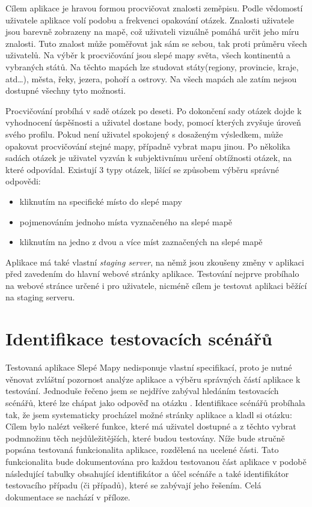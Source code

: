 \documentclass[
    color,   %
	table,   %
    twoside, %
]{fithesis3}
\begin{document}
Cílem aplikace je hravou formou procvičovat znalosti zeměpisu. Podle vědomostí uživatele aplikace volí podobu a frekvenci opakování otázek. Znalosti uživatele jsou barevně zobrazeny na mapě, což uživateli vizuálně pomáhá určit jeho míru znalosti. Tuto znalost může poměřovat jak sám se sebou, tak proti průměru všech uživatelů. Na výběr k procvičování jsou slepé mapy světa, všech kontinentů a vybraných států. Na těchto mapách lze studovat státy(regiony, provincie, kraje, atd\ldots), města, řeky, jezera, pohoří a ostrovy. Na všech mapách ale zatím nejsou dostupné všechny tyto možnosti.

Procvičování probíhá v sadě otázek po deseti. Po dokončení sady otázek dojde k vyhodnocení úspěšnosti a uživatel dostane body, pomocí kterých zvyšuje úroveň svého profilu. Pokud není uživatel spokojený s dosaženým výsledkem, může opakovat procvičování stejné mapy, případně vybrat mapu jinou. Po několika sadách otázek je uživatel vyzván k subjektivnímu určení obtížnosti otázek, na které odpovídal. Existují 3 typy otázek, lišící se způsobem výběru správné odpovědi:

\begin{itemize}
\item kliknutím na specifické místo do slepé mapy
\item pojmenováním jednoho místa vyznačeného na slepé mapě
\item kliknutím na jedno z dvou a více míst zaznačených na slepé mapě
\end{itemize}

Aplikace má také vlastní \emph{staging server}, na němž jsou zkoušeny změny v aplikaci před zavedením do hlavní webové stránky aplikace. Testování nejprve probíhalo na webové stránce určené i pro uživatele, nicméně cílem je testovat aplikaci běžící na staging serveru.

\section{Identifikace testovacích scénářů}
Testovaná aplikace Slepé Mapy nedisponuje vlastní specifikací, proto je nutné věnovat zvláštní pozornost analýze aplikace a výběru správných částí aplikace k testování. Jednoduše řečeno jsem se nejdříve zabýval hledáním testovacích scénářů, které lze chápat jako odpověď na otázku . Identifikace scénářů probíhala tak, že jsem systematicky procházel možné stránky aplikace a kladl si otázku:  Cílem bylo nalézt veškeré funkce, které má uživatel dostupné a z těchto vybrat podmnožinu těch nejdůležitějších, které budou testovány. Níže bude stručně popsána testovaná funkcionalita aplikace, rozdělená na ucelené části. Tato funkcionalita bude dokumentována pro každou testovanou část aplikace v podobě následující tabulky obsahující identifikátor a účel scénáře a také identifikátor testovacího případu (či případů), které se zabývají jeho řešením. Celá dokumentace se nachází v příloze.
\end{document}
